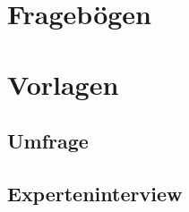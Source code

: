 

\appendix




\chapter{Fragebögen}

\thispagestyle{headings}


\blindtext[1]




\newpage




\chapter{Vorlagen}

\thispagestyle{headings}

\section{Umfrage}


\blindtext[1]



\vskip 20mm


\section{Experteninterview}



\blindtext[1]
